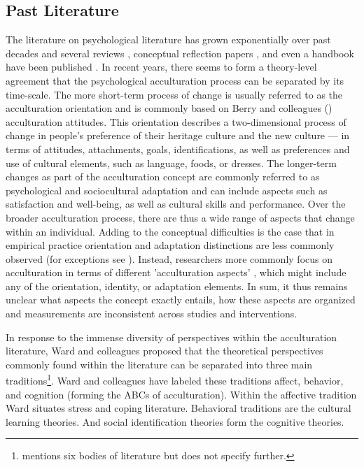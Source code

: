 \documentclass[nobib]{tufte-handout}
\begin{document}
\subsection{Past Literature}
The literature on psychological literature has grown exponentially over past decades \citet{Rudmin2003a} and several reviews \citep[e.g.,][]{DeLeersnyder2017, Matsudaira2006, Celenk2011}, conceptual reflection papers \citep[e.g.,][]{Ward2012, Berry1997b}, and even a handbook have been published \citep{Sam2006a}. 
In recent years, there seems to form a theory-level agreement that the psychological acculturation process can be separated by its time-scale. The more short-term process of change is usually referred to as the acculturation orientation \citep[e.g.,][]{Ward2001, Berry2003} and is commonly based on Berry and colleagues (\citeyear{Berry1997b, Berry2003}) acculturation attitudes. This orientation describes a two-dimensional process of change in people’s preference of their heritage culture and the new culture --- in terms of attitudes, attachments, goals, identifications, as well as preferences and use of cultural elements, such as language, foods, or dresses.
The longer-term changes as part of the acculturation concept are commonly referred to as psychological and sociocultural adaptation \citep{Searle1990, Ward2001, Berry2003} and can include aspects such as satisfaction and well-being, as well as cultural skills and performance. Over the broader acculturation process, there are thus a wide range of aspects that change within an individual. Adding to the conceptual difficulties is the case that in empirical practice orientation and adaptation distinctions are less commonly observed (for exceptions see \citealp{ICSEYteam2006, Berry2006b, TeLindert2008a}). Instead, researchers more commonly focus on acculturation in terms of different 'acculturation aspects' \citep{Arends-Toth2006a}, which might include any of the orientation, identity, or adaptation elements. In sum, it thus remains unclear what aspects the concept exactly entails, how these aspects are organized and measurements are inconsistent across studies and interventions.

In response to the immense diversity of perspectives within the acculturation literature, Ward and colleagues \citep{Ward2001, Masgoret2006, Ward2019} proposed that the theoretical perspectives commonly found within the literature can be separated into three main traditions\footnote{\citet{Ward2001} mentions six bodies of literature but does not specify further.}. Ward and colleagues have labeled these traditions affect, behavior, and cognition (forming the ABCs of acculturation). Within the affective tradition Ward situates stress and coping literature. Behavioral traditions are the cultural learning theories. And social identification theories form the cognitive theories.
\end{document}
